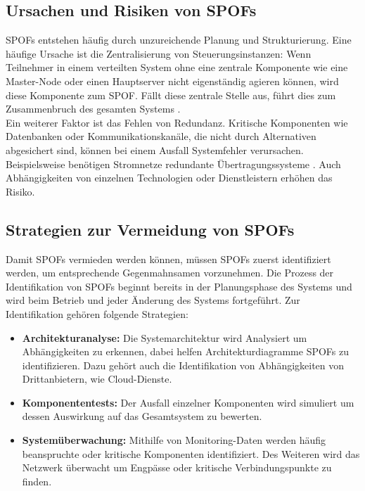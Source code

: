 \documentclass[a4paper,12pt]{article}
\begin{document}
\subsection{Ursachen und Risiken von SPOFs}
SPOFs entstehen häufig durch unzureichende Planung und Strukturierung. Eine häufige Ursache ist die Zentralisierung von Steuerungsinstanzen: Wenn Teilnehmer in einem verteilten System ohne eine zentrale Komponente wie eine Master-Node oder einen Hauptserver nicht eigenständig agieren können, wird diese Komponente zum SPOF. Fällt diese zentrale Stelle aus, führt dies zum Zusammenbruch des gesamten Systems \cite[S. 253f.]{Steen2006}.\\
Ein weiterer Faktor ist das Fehlen von Redundanz. Kritische Komponenten wie Datenbanken oder Kommunikationskanäle, die nicht durch Alternativen abgesichert sind, können bei einem Ausfall Systemfehler verursachen. Beispielsweise benötigen Stromnetze redundante Übertragungssysteme \cite[S. 61f.]{Jarass2009}. Auch Abhängigkeiten von einzelnen Technologien oder Dienstleistern erhöhen das Risiko. 


\subsection{Strategien zur Vermeidung von SPOFs}

Damit SPOFs vermieden werden können, müssen SPOFs zuerst identifiziert werden, um entsprechende Gegenmahnsamen vorzunehmen. Die Prozess der Identifikation von SPOFs beginnt bereits in der Planungsphase des Systems und wird beim Betrieb und jeder Änderung des Systems fortgeführt. Zur Identifikation gehören folgende Strategien:

\begin{itemize}
    \item \textbf{Architekturanalyse:} Die Systemarchitektur wird Analysiert um Abhängigkeiten zu erkennen, dabei helfen Architekturdiagramme SPOFs zu identifizieren. Dazu gehört auch die Identifikation von Abhängigkeiten von Drittanbietern, wie Cloud-Dienste.
    \item \textbf{Komponententests:} Der Ausfall einzelner Komponenten wird simuliert um dessen Auswirkung auf das Gesamtsystem zu bewerten.
    \item \textbf{Systemüberwachung:} Mithilfe von Monitoring-Daten werden häufig beanspruchte oder kritische Komponenten identifiziert. Des Weiteren wird das Netzwerk überwacht um Engpässe oder kritische Verbindungspunkte zu finden. 
\end{itemize}
\end{document}
